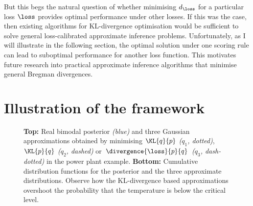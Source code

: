 But this begs the natural question of whether minimising $d_\loss$ for a particular loss $\loss$ provides optimal performance under other losses. If this was the case, then existing algorithms for KL-divergence optimisation would be sufficient to solve general loss-calibrated approximate inference problems. Unfortunately, as I will illustrate in the following section, the optimal solution under one scoring rule can lead to suboptimal performance for another loss function. This motivates future research into practical approximate inference algorithms that minimise general Bregman divergences.

\section{Illustration of the framework \label{sec:toy}}

\begin{figure}
\centering
{}
 \caption[Illustrating of approximate inference in a loss-critical toy example]{\textbf{Top:} Real bimodal posterior \emph{(blue)} and three Gaussian approximations obtained by minimising  $\KL{q}{p}$ \emph{($q_1$, dotted)}, $\KL{p}{q}$ \emph{($q_2$, dashed)} or $\divergence{\loss}{p}{q}$ \emph{($q_3$, dash-dotted)} in the power plant example. \textbf{Bottom:} Cumulative distribution functions for the posterior and the three approximate distributions. Observe how the KL-divergence based approximations overshoot the probability that the temperature is below the critical level.}  \label{fig:toy}
\end{figure}


